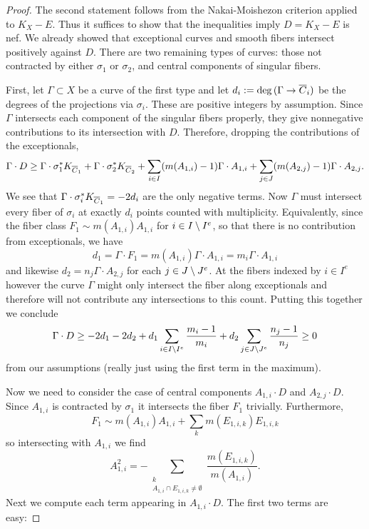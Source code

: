 \documentclass[main.tex]{subfiles}
\begin{document}
\begin{proof}
The second statement follows from the Nakai-Moishezon criterion applied to $K_X - E$. Thus it suffices to show that the inequalities imply $D = K_X - E$ is nef. We already showed that exceptional curves and smooth fibers intersect positively against $D$. There are two remaining types of curves: those not contracted by either $\sigma_1$ or $\sigma_2$, and central components of singular fibers. 
\par 
First, let $\Gamma \subset X$ be a curve of the first type and let $d_i := \deg{(\Gamma \to \overline{C}_i)}$ be the degrees of the projections via $\sigma_i$. These are positive integers by assumption. Since $\Gamma$ intersects each component of the singular fibers properly, they give nonnegative contributions to its intersection with $D$. Therefore, dropping the contributions of the exceptionals,
\[ \Gamma \cdot D \ge \Gamma \cdot \sigma_1^* K_{\overline{C}_1} + \Gamma \cdot \sigma_2^* K_{\overline{C}_2} + \sum_{i \in I}  (m(A_{1,i}) - 1) \Gamma \cdot A_{1,i} + \sum_{j \in J}  (m(A_{2,j}) - 1) \Gamma \cdot A_{2,j}. \]
We see that $\Gamma \cdot \sigma_i^* K_{\overline{C}_1} = -2 d_i$ are the only negative terms. Now $\Gamma$ must intersect every fiber of $\sigma_i$ at exactly $d_i$ points counted with multiplicity. Equivalently, since the fiber class $F_1 \sim m(A_{1,i}) A_{1,i}$ for $i \in I \setminus I^e$, so that there is no contribution from exceptionals, we have 
\[ d_1 = \Gamma \cdot F_1 = m(A_{1,i}) \Gamma \cdot A_{1,i} = m_i \Gamma \cdot A_{1,i} \]
and likewise $d_2 = n_j \Gamma \cdot A_{2,j}$ for each $j \in J \setminus J^e$. At the fibers indexed by $i \in I^e$ however the curve $\Gamma$ might only intersect the fiber along exceptionals and therefore will not contribute any intersections to this count. Putting this together we conclude
\[ \Gamma \cdot D \ge -2 d_1 - 2 d_2 + d_1 \sum_{i \in I \setminus I^{e}} \frac{m_i - 1}{m_i} + d_2 \sum_{j \in J \setminus J^{e}} \frac{n_j - 1}{n_j} \ge 0 \]
from our assumptions (really just using the first term in the maximum). 
\par 
Now we need to consider the case of central components $A_{1,i} \cdot D$ and $A_{2,j} \cdot D$. Since $A_{1,i}$ is contracted by $\sigma_1$ it intersects the fiber $F_1$ trivially. Furthermore,
\[ F_1 \sim m(A_{1,i}) A_{1,i} + \sum_k m(E_{1,i,k}) E_{1,i,k} \]
so intersecting with $A_{1,i}$ we find
\[ A_{1,i}^2 = - \sum_{\substack{k \\ A_{1,i} \cap E_{1,i,k} \neq \emptyset}} \frac{m(E_{1,i,k})}{m(A_{1,i})}. \]
Next we compute each term appearing in $A_{1,i} \cdot D$. The first two terms are easy:

\end{proof}
\end{document}
